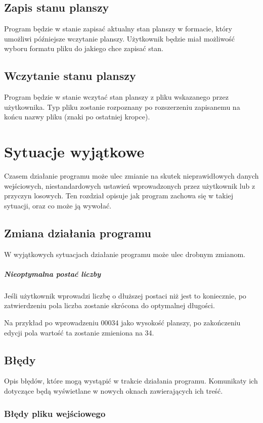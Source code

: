 \documentclass{report}
\begin{document}
\section{Zapis stanu planszy}
Program będzie w stanie zapisać aktualny stan planszy w formacie, który umożliwi późniejsze wczytanie planszy. Użytkownik będzie miał możliwość wyboru formatu pliku do jakiego chce zapisać stan.

\section{Wczytanie stanu planszy}
Program będzie w stanie wczytać stan planszy z pliku wskazanego przez użytkownika. Typ pliku zostanie rozpoznany po rozszerzeniu zapisanemu na końcu nazwy pliku (znaki po ostatniej kropce).

\chapter{Sytuacje wyjątkowe}
Czasem działanie programu może ulec zmianie na skutek nieprawidłowych danych wejściowych, niestandardowych ustawień wprowadzonych przez użytkownik lub z przyczyn losowych. Ten rozdział opisuje jak program zachowa się w takiej sytuacji, oraz co może ją wywołać.

\section{Zmiana działania programu}
W wyjątkowych sytuacjach działanie programu może ulec drobnym zmianom.

\paragraph{Nieoptymalna postać liczby}
Jeśli użytkownik wprowadzi liczbę o dłuższej postaci niż jest to koniecznie, po zatwierdzeniu pola liczba zostanie skrócona do optymalnej długości.

Na przykład po wprowadzeniu 00034 jako wysokość planszy, po zakończeniu edycji pola wartość ta zostanie zmieniona na 34.

\section{Błędy}
Opis błędów, które mogą wystąpić w trakcie działania programu. Komunikaty ich dotyczące będą wyświetlane w nowych oknach zawierających ich treść.

\subsection{Błędy pliku wejściowego}
\end{document}
